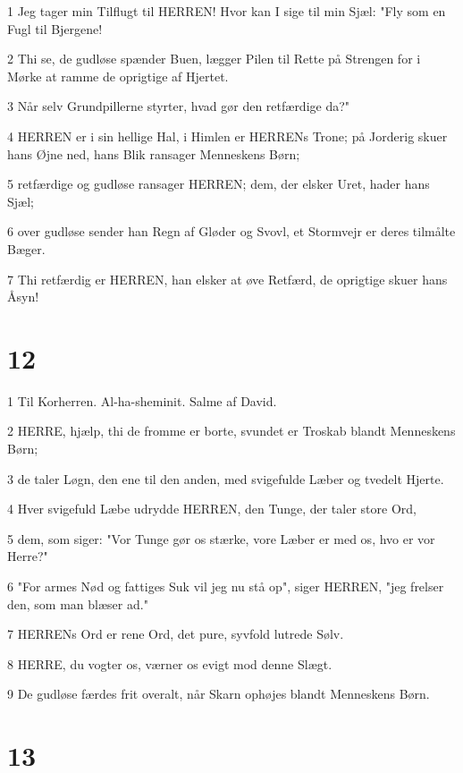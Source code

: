 \par 1 Jeg tager min Tilflugt til HERREN! Hvor kan I sige til min Sjæl: "Fly som en Fugl til Bjergene!
\par 2 Thi se, de gudløse spænder Buen, lægger Pilen til Rette på Strengen for i Mørke at ramme de oprigtige af Hjertet.
\par 3 Når selv Grundpillerne styrter, hvad gør den retfærdige da?"
\par 4 HERREN er i sin hellige Hal, i Himlen er HERRENs Trone; på Jorderig skuer hans Øjne ned, hans Blik ransager Menneskens Børn;
\par 5 retfærdige og gudløse ransager HERREN; dem, der elsker Uret, hader hans Sjæl;
\par 6 over gudløse sender han Regn af Gløder og Svovl, et Stormvejr er deres tilmålte Bæger.
\par 7 Thi retfærdig er HERREN, han elsker at øve Retfærd, de oprigtige skuer hans Åsyn!

\chapter{12}

\par 1 Til Korherren. Al-ha-sheminit. Salme af David.
\par 2 HERRE, hjælp, thi de fromme er borte, svundet er Troskab blandt Menneskens Børn;
\par 3 de taler Løgn, den ene til den anden, med svigefulde Læber og tvedelt Hjerte.
\par 4 Hver svigefuld Læbe udrydde HERREN, den Tunge, der taler store Ord,
\par 5 dem, som siger: "Vor Tunge gør os stærke, vore Læber er med os, hvo er vor Herre?"
\par 6 "For armes Nød og fattiges Suk vil jeg nu stå op", siger HERREN, "jeg frelser den, som man blæser ad."
\par 7 HERRENs Ord er rene Ord, det pure, syvfold lutrede Sølv.
\par 8 HERRE, du vogter os, værner os evigt mod denne Slægt.
\par 9 De gudløse færdes frit overalt, når Skarn ophøjes blandt Menneskens Børn.

\chapter{13}

